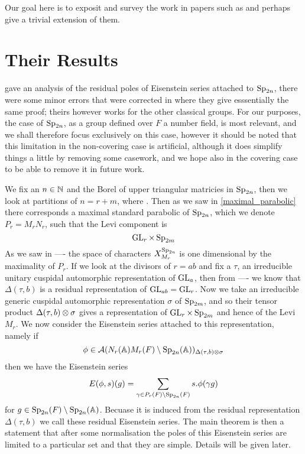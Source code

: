 Our goal here is to exposit and survey the work in papers such as \cite{brennerNotesAnalyticProperties2009}\cite{jiangPolesCertainResidual2013}\cite{ginzburgTopFourierCoefficients2021} and perhaps give a trivial extension of them.


\section{Their Results}
\cite{brennerNotesAnalyticProperties2009} gave an analysis of the residual poles of Eisenstein series attached to \(\operatorname{Sp}_{2n}\), there were some minor errors that were corrected in \cite{jiangPolesCertainResidual2013} where they give esssentially the same proof; theirs however works for the other classical groups. For our purposes, the case of \(\operatorname{Sp}_{2n}\), as a group defined over \(F\) a number field, is most relevant, and we shall therefore focus exclusively on this case, however it should be noted that this limitation in the non-covering case is artificial, although it does simplify things a little by removing some casework, and we hope also in the covering case to be able to remove it in future work. 

We fix an \(n\in \N\) and the Borel of upper triangular matricies in \(\operatorname{Sp}_{2n} \), then we look at partitions of \(n = r + m\), where . Then as we saw in \ref{maximal_parabolic} there corresponds a maximal standard parabolic of \(\operatorname{Sp}_{2n}\), which we denote \(P_r = M_rN_r\), such that the Levi component is 
\[\operatorname{GL}_r\times \operatorname{Sp}_{2m} \]
As we saw in ---- the space of characters \(X^{\operatorname{Sp}_{2n}}_{M_r}\) is one dimensional by the maximality of \(P_r\). If we look at the divisors of \(r = ab\)  and fix a \(\tau\), an irreducible unitary cuspidal automorphic representation of \(\operatorname{GL}_a\), then from  ---- we know that \(\Delta(\tau, b)\) is a residual representation of \(\operatorname{GL}_{ab} = \operatorname{GL}_r\). Now we take an irreducible generic cuspidal automorphic representation \(\sigma\) of \(\operatorname{Sp}_{2m}\), and so their tensor product \(\Delta(\tau, b) \otimes \sigma\) gives a representation of \(\operatorname{GL}_{r}\times \operatorname{Sp}_{2m}\) and hence of the Levi \(M_r\). We now consider the Eisenstein series attached to this representation, namely if 
\[\phi\in \mathcal{A}(N_r(\A)M_r(F)\setminus \Sp_{2n}(\A) )_{\Delta(\tau, b)\tensor \sigma}\] 
then we have the Eisenstein series
\[E(\phi, s)(g) = \sum_{\gamma\in P_r(F) \setminus \Sp_{2n}(F)} s.\phi(\gamma g)\]
for \(g\in \Sp_{2n}(F) \setminus \Sp_{2n}(\A)\). Becuase it is induced from the residual representation \(\Delta(\tau, b)\) we call these residual Eisenstein series. The main theorem is then a statement that after some normalisation the poles of this Eisenstein series are limited to a particular set and that they are simple. Details will be given later.


